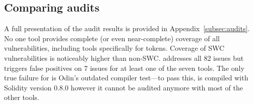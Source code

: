 
\subsection{Comparing audits}

A full presentation of the audit results is provided in Appendix~\ref{subsec:audits}. No one tool provides complete (or even near-complete) coverage of all vulnerabilities, including tools specifically for tokens. Coverage of SWC vulnerabilities is noticeably higher than non-SWC. \sys addresses all 82 issues but triggers false positives on 7 issues for at least one of the seven tools. The only true failure for \sys is Odin's outdated compiler test---to pass this, \sys is compiled with Solidity version 0.8.0 however it cannot be audited anymore with most of the other tools.



%

